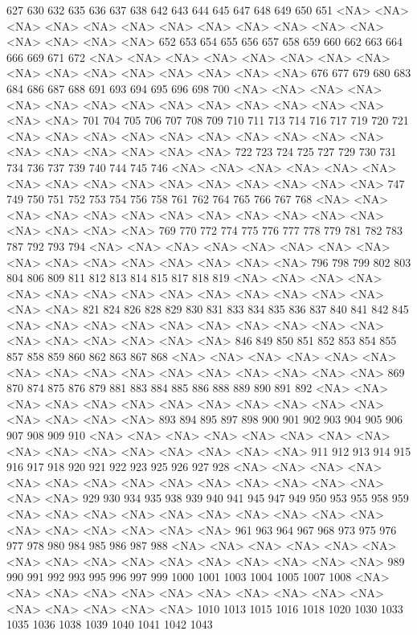 \documentclass{article}
\begin{document}
\begin{Schunk}
\begin{Soutput}
 627  630  632  635  636  637  638  642  643  644  645  647  648  649  650  651 
<NA> <NA> <NA> <NA> <NA> <NA> <NA> <NA> <NA> <NA> <NA> <NA> <NA> <NA> <NA> <NA> 
 652  653  654  655  656  657  658  659  660  662  663  664  666  669  671  672 
<NA> <NA> <NA> <NA> <NA> <NA> <NA> <NA> <NA> <NA> <NA> <NA> <NA> <NA> <NA> <NA> 
 676  677  679  680  683  684  686  687  688  691  693  694  695  696  698  700 
<NA> <NA> <NA> <NA> <NA> <NA> <NA> <NA> <NA> <NA> <NA> <NA> <NA> <NA> <NA> <NA> 
 701  704  705  706  707  708  709  710  711  713  714  716  717  719  720  721 
<NA> <NA> <NA> <NA> <NA> <NA> <NA> <NA> <NA> <NA> <NA> <NA> <NA> <NA> <NA> <NA> 
 722  723  724  725  727  729  730  731  734  736  737  739  740  744  745  746 
<NA> <NA> <NA> <NA> <NA> <NA> <NA> <NA> <NA> <NA> <NA> <NA> <NA> <NA> <NA> <NA> 
 747  749  750  751  752  753  754  756  758  761  762  764  765  766  767  768 
<NA> <NA> <NA> <NA> <NA> <NA> <NA> <NA> <NA> <NA> <NA> <NA> <NA> <NA> <NA> <NA> 
 769  770  772  774  775  776  777  778  779  781  782  783  787  792  793  794 
<NA> <NA> <NA> <NA> <NA> <NA> <NA> <NA> <NA> <NA> <NA> <NA> <NA> <NA> <NA> <NA> 
 796  798  799  802  803  804  806  809  811  812  813  814  815  817  818  819 
<NA> <NA> <NA> <NA> <NA> <NA> <NA> <NA> <NA> <NA> <NA> <NA> <NA> <NA> <NA> <NA> 
 821  824  826  828  829  830  831  833  834  835  836  837  840  841  842  845 
<NA> <NA> <NA> <NA> <NA> <NA> <NA> <NA> <NA> <NA> <NA> <NA> <NA> <NA> <NA> <NA> 
 846  849  850  851  852  853  854  855  857  858  859  860  862  863  867  868 
<NA> <NA> <NA> <NA> <NA> <NA> <NA> <NA> <NA> <NA> <NA> <NA> <NA> <NA> <NA> <NA> 
 869  870  874  875  876  879  881  883  884  885  886  888  889  890  891  892 
<NA> <NA> <NA> <NA> <NA> <NA> <NA> <NA> <NA> <NA> <NA> <NA> <NA> <NA> <NA> <NA> 
 893  894  895  897  898  900  901  902  903  904  905  906  907  908  909  910 
<NA> <NA> <NA> <NA> <NA> <NA> <NA> <NA> <NA> <NA> <NA> <NA> <NA> <NA> <NA> <NA> 
 911  912  913  914  915  916  917  918  920  921  922  923  925  926  927  928 
<NA> <NA> <NA> <NA> <NA> <NA> <NA> <NA> <NA> <NA> <NA> <NA> <NA> <NA> <NA> <NA> 
 929  930  934  935  938  939  940  941  945  947  949  950  953  955  958  959 
<NA> <NA> <NA> <NA> <NA> <NA> <NA> <NA> <NA> <NA> <NA> <NA> <NA> <NA> <NA> <NA> 
 961  963  964  967  968  973  975  976  977  978  980  984  985  986  987  988 
<NA> <NA> <NA> <NA> <NA> <NA> <NA> <NA> <NA> <NA> <NA> <NA> <NA> <NA> <NA> <NA> 
 989  990  991  992  993  995  996  997  999 1000 1001 1003 1004 1005 1007 1008 
<NA> <NA> <NA> <NA> <NA> <NA> <NA> <NA> <NA> <NA> <NA> <NA> <NA> <NA> <NA> <NA> 
1010 1013 1015 1016 1018 1020 1030 1033 1035 1036 1038 1039 1040 1041 1042 1043 

\end{Soutput}
\end{Schunk}
\end{document}

